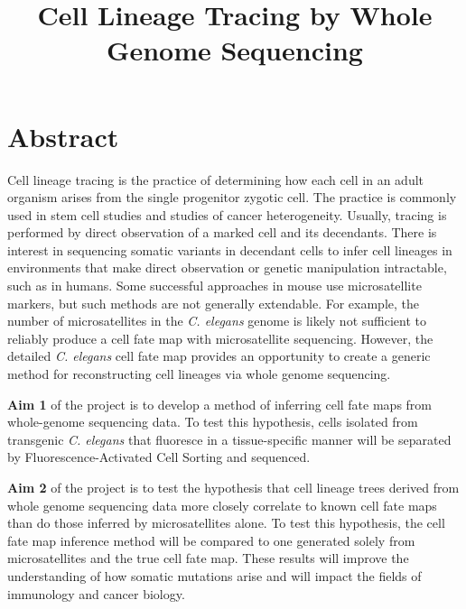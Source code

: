 \documentclass[12pt]{article}
\title{Cell Lineage Tracing by Whole Genome Sequencing}
\date{}
\begin{document}
\maketitle





\section{Abstract}

Cell lineage tracing is the practice of determining how each cell in an adult organism arises from the single progenitor zygotic cell.
The practice is commonly used in stem cell studies and studies of cancer heterogeneity.
Usually, tracing is performed by direct observation of a marked cell and its decendants.
There is interest in sequencing somatic variants in decendant cells to infer cell lineages in environments that make direct observation or genetic manipulation intractable, such as in humans.
Some successful approaches in mouse use microsatellite markers, but such methods are not generally extendable.
For example, the number of microsatellites in the \textit{C. elegans} genome is likely not sufficient to reliably produce a cell fate map with microsatellite sequencing.
However, the detailed \textit{C. elegans} cell fate map provides an opportunity to create a generic method for reconstructing cell lineages via whole genome sequencing. 

\textbf{Aim 1} of the project is to develop a method of inferring cell fate maps from whole-genome sequencing data.
To test this hypothesis, cells isolated from transgenic \textit{C. elegans} that fluoresce in a tissue-specific manner will be separated by Fluorescence-Activated Cell Sorting and sequenced.

\textbf{Aim 2} of the project is to test the hypothesis that cell lineage trees derived from whole genome sequencing data more closely correlate to known cell fate maps than do those inferred by microsatellites alone.
To test this hypothesis, the cell fate map inference method will be compared to one generated solely from microsatellites and the true cell fate map.
These results will improve the understanding of how somatic mutations arise and will impact the fields of immunology and cancer biology.
\end{document}
